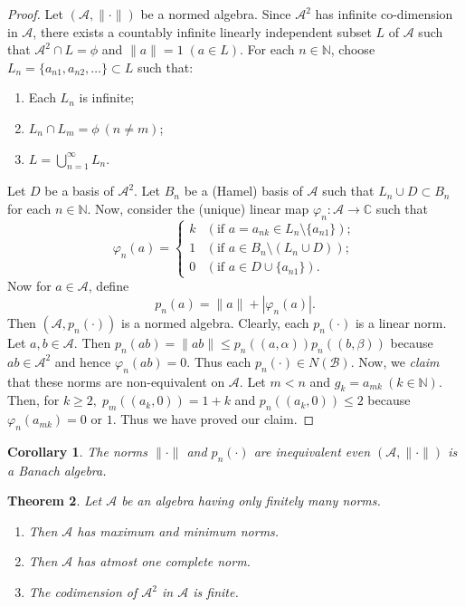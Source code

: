 \documentclass{amsart}
\newtheorem{thm}{Theorem}[section]
\newtheorem{cor}[thm]{Corollary}
\theoremstyle{definition}
\numberwithin{equation}{section}
\begin{document}
 \begin{proof} Let $(\mathcal{A}, \| \cdot \|)$ be a normed algebra. Since $\mathcal{A}^2$ has infinite co-dimension in $\mathcal{A}$, there exists a countably infinite linearly independent subset $L$ of $\mathcal{A}$ such that $\mathcal{A}^2 \cap L = \phi$ and $\| a \| =1 \; (a \in L)$. For each $n \in \mathbb{N}$, choose $L_n = \{ a_{n1}, a_{n2}, \ldots \} \subset L$ such that: 
 	\begin{enumerate}
 		\item Each $L_n$ is infinite;
 		\item $L_n \cap L_m = \phi \ (n \neq m)$;
 		\item  $L = \bigcup_{n=1}^{ \infty} L_n$.
 	\end{enumerate}
 	Let $D$ be a basis of $\mathcal{A}^2$. Let $B_n$ be a (Hamel) basis of $\mathcal{A}$ such that $L_n \cup D \subset B_n$ for each $n \in \mathbb{N}$. Now, consider the (unique) linear map $\varphi_n : \mathcal{A} \longrightarrow \mathbb{C}$ such that
 	\[
 	\varphi_n(a)=
 	\begin{cases}
 		k&  (\text{if } a=a_{nk}  \in L_n \setminus \{a_{n1}\});\\
 		1 & (\text{if } a \in B_n \setminus (L_n \cup D)); \\
 		0 & (\text{if } a \in D \cup \{a_{n1}\}).
 	\end{cases}
 	\]
 	Now for $a \in \mathcal{A}$, define
 	$$p_n(a)=\|a\|+ |\varphi_n(a)|.$$
 	Then $(\mathcal{A}, p_n( \cdot ))$ is a normed algebra.
 	Clearly, each $p_n(\cdot)$ is a linear norm. Let $a, b \in \mathcal{A}$. Then $p_n(ab)  = \|ab\| \leq p_n((a, \alpha))p_n((b, \beta))$ because $ab \in \mathcal{A}^2$ and hence $\varphi_n(ab) = 0$. Thus each $p_n(\cdot) \in N(\mathcal{B})$. Now, we \textit{claim} that these norms are non-equivalent on $\mathcal{A}$. Let $m < n$ and $g_k = a_{mk} \ (k \in \mathbb{N})$. Then, for $k \geq 2, \; p_m((a_k, 0)) = 1+k$ and $p_n((a_k, 0)) \leq 2$ because $\varphi_n(a_{mk}) = 0 \text{ or 1}$. Thus we have proved our claim.
 \end{proof}
 
\begin{cor}
	The norms $\| \cdot \|$ and $p_n(\cdot)$ are inequivalent even $(\mathcal{A}, \| \cdot \|)$ is a Banach algebra.
\end{cor}

\begin{thm}
	Let $\mathcal{A}$ be an algebra having only finitely many norms.
	\begin{enumerate}
		\item Then $\mathcal{A}$ has maximum and minimum norms. 
		\item Then $\mathcal{A}$ has atmost one complete norm.
		\item The codimension of $\mathcal{A}^2$ in $\mathcal{A}$ is finite.
	\end{enumerate}
	 
\end{thm}
\end{document}
